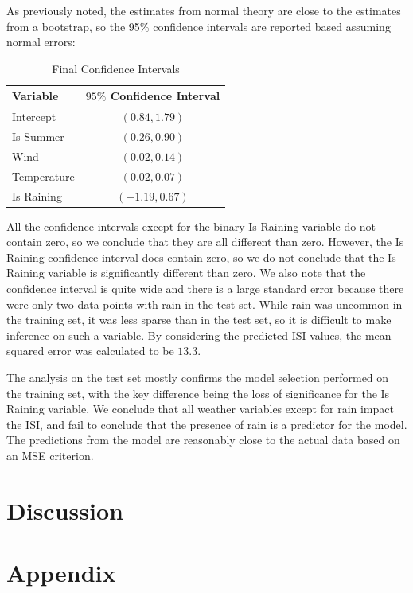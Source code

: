 \documentclass{article}
\begin{document}
As previously noted, the estimates from normal theory are close to the estimates from a bootstrap, so the 95\% confidence intervals are reported based assuming normal errors:
\begin{table}
\centering
\begin{tabular}{  | l | c | }\hline
  Variable & $95\%$  Confidence Interval \\ \hline
  Intercept & $(  0.84,1.79  )$ \\
  Is Summer & $( 0.26,0.90   )$\\
  Wind & $(  0.02,0.14  )$ \\
  Temperature & $(  0.02,0.07  )$ \\
  Is Raining & $(  -1.19,0.67  )$ \\
  \hline
\end{tabular}
\caption{Final Confidence Intervals}
\label{Confidence Intervals}
\end{table}
All the confidence intervals except for the binary Is Raining variable do not contain zero, so we conclude that they are all different than zero.
However, the Is Raining confidence interval does contain zero, so we do not conclude that the Is Raining variable is significantly different than zero.  We also note that the confidence interval is quite wide and there is a large standard error because there were only two data points with rain in the test set. While rain was uncommon in the training set, it was less sparse than in the test set, so it is difficult to make inference on such a variable. 
By considering the predicted ISI values, the mean squared error was calculated to be $13.3$. 


The analysis on the test set mostly confirms the model selection performed on the training set, with the key difference being the loss of significance for the Is Raining variable.  We conclude that all weather variables except for rain impact the ISI, and fail to conclude that the presence of rain is a predictor for the model. The predictions from the model are reasonably close to the actual data based on an MSE criterion. 




\section{Discussion}\label{Discussion}

\section{Appendix}
\end{document}
